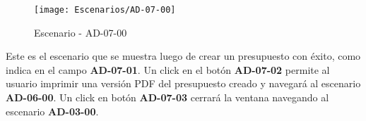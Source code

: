 \begin{figure}[H]
\centering
\texttt{[image: Escenarios/AD-07-00]}
\caption{Escenario - AD-07-00}
\label{fig:AD-07-00}
\end{figure}
Este es el escenario que se muestra luego de crear un presupuesto con éxito, como indica en el campo \textbf{AD-07-01}. Un click en el botón \textbf{AD-07-02} permite al usuario imprimir una versión PDF del presupuesto creado y navegará al escenario \textbf{AD-06-00}. Un click en botón \textbf{AD-07-03} cerrará la ventana navegando al escenario \textbf{AD-03-00}.
\\